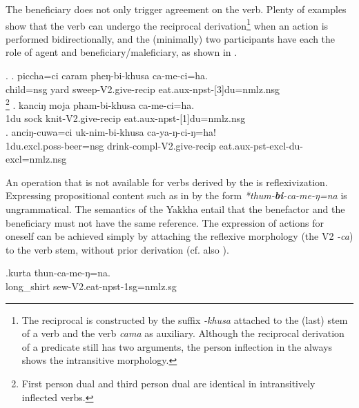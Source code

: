 The beneficiary does not only trigger agreement on the verb. Plenty of examples show that the  verb can undergo the reciprocal derivation\footnote{The reciprocal is constructed by the suffix \emph{-khusa} attached to the (last) stem of a verb and the verb \emph{cama}  as auxiliary. Although the  reciprocal derivation of a  predicate still has two arguments, the person inflection in the  always shows the intransitive morphology.} when an action is performed bidirectionally, and the (minimally) two participants have each the role of agent and beneficiary/maleficiary, as shown in \Next.  

\ex. \ag. piccha=ci caram pheŋ-bi-khusa ca-me-ci=ha.\\
 child{\sc =nsg} yard sweep-{\sc V2.give-recip} eat{\sc .aux-npst-[3]du=nmlz.nsg}\\
\footnote{First person dual  and third person dual are  identical in intransitively inflected verbs.}
\bg. kanciŋ moja pham-bi-khusa ca-me-ci=ha.\\
 {\sc 1du} sock knit-{\sc V2.give-recip} eat{\sc .aux-npst-[1]du=nmlz.nsg}\\
 \bg. anciŋ-cuwa=ci uk-nim-bi-khusa ca-ya-ŋ-ci-ŋ=ha!\\
 {\sc 1du.excl.poss}-beer{\sc =nsg} drink-{\sc compl-V2.give-recip} eat{\sc .aux-pst-excl-du-excl=nmlz.nsg}\\
 
 
An operation that is not available for verbs derived by the  is reflexivization. Expressing propositional content such as in  \Next by the form \emph{*thum-\textbf{bi}-ca-me-ŋ=na} is ungrammatical. The semantics of the Yakkha  entail that the benefactor and the beneficiary must not have the same reference. The expression of actions for oneself can be achieved simply by attaching the reflexive morphology (the V2 \emph{-ca}) to the verb stem, without prior  derivation (cf. also ).

\exg.kurta thun-ca-me-ŋ=na.\\
	long\_shirt sew{\sc -V2.eat-npst-1sg=nmlz.sg} 	\\



